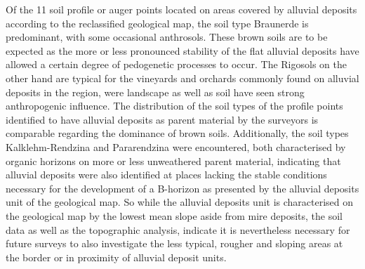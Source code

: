 \documentclass[preprint,12pt,authoryear]{elsarticle}
\begin{document}
Of the 11 soil profile or auger points located on areas covered by alluvial deposits according to the reclassified geological map, the soil type Braunerde is predominant, with some occasional anthrosols. These brown soils are to be expected as the more or less pronounced stability of the flat alluvial deposits have allowed a certain degree of pedogenetic processes to occur. The Rigosols on the other hand are typical for the vineyards and orchards commonly found on alluvial deposits in the region, were landscape as well as soil have seen strong anthropogenic influence. The distribution of the soil types of the profile points identified to have alluvial deposits as parent material by the surveyors is comparable regarding the dominance of brown soils. Additionally, the soil types Kalklehm-Rendzina and Pararendzina were encountered, both characterised by organic horizons on more or less unweathered parent material, indicating that alluvial deposits were also identified at places lacking the stable conditions necessary for the development of a B-horizon as presented by the alluvial deposits unit of the geological map.  So while the alluvial deposits unit is characterised on the geological map by the lowest mean slope aside from mire deposits, the soil data as well as the topographic analysis, indicate it is nevertheless necessary for future surveys to also investigate the less typical, rougher and sloping areas at the border or in proximity of alluvial deposit units.
\end{document}
